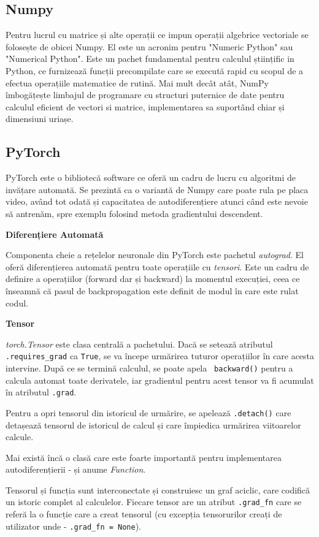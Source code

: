 \subsection{Numpy}

Pentru lucrul cu matrice și alte operații ce impun operații algebrice vectoriale se folosește de obicei Numpy. El este un acronim pentru "Numeric Python" sau "Numerical Python". Este un pachet fundamental pentru calculul științific in Python, ce furnizează funcții precompilate care se execută rapid cu scopul de a efectua operațiile matematice de rutină.  Mai mult decât atât, NumPy îmbogățește limbajul de programare cu structuri puternice de date pentru calculul eficient de vectori si matrice, implementarea sa suportând chiar și dimensiuni uriașe.

\subsection{PyTorch}


PyTorch este o bibliotecă software ce oferă un cadru de lucru cu algoritmi de invățare automată. Se prezintă ca o variantă de Numpy care poate rula pe placa video, având tot odată și capacitatea de autodiferențiere atunci când este nevoie să antrenăm, spre exemplu folosind metoda gradientului descendent.

\textbf{Diferențiere Automată}

Componenta cheie a rețelelor neuronale din PyTorch este pachetul \textit{autograd}. El oferă diferențierea automată pentru toate operațiile cu \textit{tensori}. Este un cadru de definire a operațiilor (forward dar și backward) la momentul execuției, ceea ce înseamnă că pasul de backpropagation este definit de modul în care este rulat codul.

\textbf{Tensor}

\textit{torch.Tensor} este clasa centrală a pachetului. Dacă se setează atributul \texttt{.requires\_grad} ca  \texttt{True}, se va începe urmărirea tuturor operațiilor în care acesta intervine. După ce se termină calculul, se poate apela \texttt{ backward()} pentru a calcula automat toate derivatele, iar gradientul pentru acest tensor va fi acumulat în atributul \texttt{.grad}.

Pentru a opri tensorul din istoricul de urmărire, se apelează \texttt{.detach()} care detașează tensorul de istoricul de calcul și care împiedica urmărirea viitoarelor calcule.

Mai există încă o clasă care este foarte importantă pentru implementarea autodiferențierii - și anume \textit{Function}.

Tensorul și funcția sunt interconectate și construiesc un graf aciclic, care codifică un istoric complet al calculelor. Fiecare tensor are un atribut  \texttt{.grad\_fn} care se referă la o funcție care a creat tensorul (cu excepția tensorurilor creați de utilizator unde - \texttt{.grad\_fn = None}).